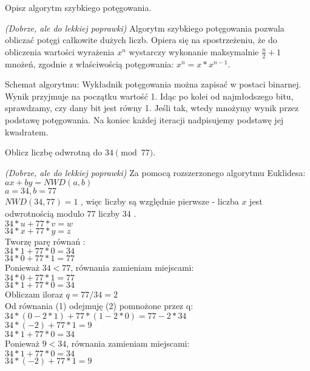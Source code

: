 \documentclass[answers,11pt]{exam}
\newcommand{\fixit}{\textit{(Dobrze, ale do lekkiej poprawki)} }
\begin{document}
\begin{questions}
\question Opisz algorytm szybkiego potęgowania.
\begin{solution}
\fixit
Algorytm szybkiego potęgowania pozwala obliczać potęgi całkowite dużych liczb. Opiera się na spostrzeżeniu, że do obliczenia wartości wyrażenia $x^n$ wystarczy wykonanie maksymalnie $\frac{n}{2} + 1$ mnożeń, zgodnie z właściwością potęgowania: $x^n = x * x^{n-1}$.

Schemat algorytmu: 
Wykładnik potęgowania można zapisać w postaci binarnej. Wynik przyjmuje na początku wartość 1. Idąc po kolei od najmłodszego bitu, sprawdzamy, czy dany bit jest równy 1. Jeśli tak, wtedy mnożymy wynik przez podstawę potęgowania. Na koniec każdej iteracji nadpisujemy podstawę jej kwadratem. 
\end{solution}

\question Oblicz liczbę odwrotną do $34 \pmod{77}$.
\begin{solution}
\fixit
Za pomocą rozszerzonego algorytmu Euklidesa:\\

$ax + by = NWD(a,b)$\\
$a = 34, b = 77$\\

$NWD(34,77) = 1$ , więc liczby są względnie pierwsze - liczba $x$ jest odwrotnością modulo $77$ liczby $34$ .\\ 

$ 34 * u + 77 * v = w$\\
$ 34 * x + 77 * y = z$\\

Tworzę parę równań :\\
$ 34 * 1 + 77 * 0 = 34$\\
$ 34 * 0 + 77 * 1 = 77$\\

Ponieważ $34 < 77$, równania zamieniam miejscami:\\
$ 34 * 0 + 77 * 1 = 77$\\
$ 34 * 1 + 77 * 0 = 34$\\
Obliczam iloraz $q = 77 / 34 = 2$\\
Od równania (1) odejmuję (2) pomnożone przez q:\\
$ 34 * (0 - 2 * 1)  + 77 * (1 - 2 * 0) = 77 - 2 * 34$\\
$ 34 * (-2) + 77 * 1 = 9$\\
$ 34 * 1 + 77 * 0 = 34$\\

Ponieważ $9 < 34$, równania zamieniam miejscami:\\
$ 34 * 1 + 77 * 0 = 34$\\
$ 34 * (-2) + 77 * 1 = 9$\\


\end{solution}
\end{questions}
\end{document}
